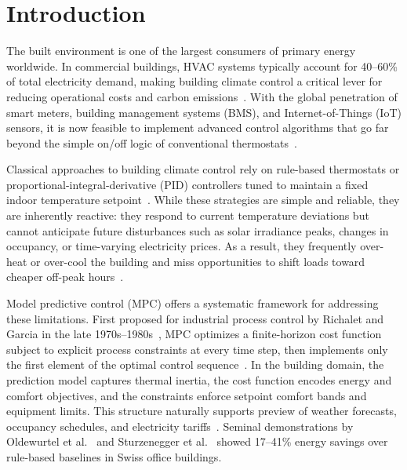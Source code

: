 \documentclass[conference,a4paper]{IEEEtran}[2015/08/26]
\begin{document}
\IEEEpeerreviewmaketitle

\section{Introduction}
\label{sec:introduction}

The built environment is one of the largest consumers of primary energy
worldwide. In commercial buildings, HVAC systems typically account for
40--60\% of total electricity demand, making building climate control a
critical lever for reducing operational costs and carbon
emissions~\cite{ASHRAE2017,Drgona2020}. With the global penetration of
smart meters, building management systems (BMS), and Internet-of-Things
(IoT) sensors, it is now feasible to implement advanced control
algorithms that go far beyond the simple on/off logic of conventional
thermostats~\cite{Sturzenegger2016}.

Classical approaches to building climate control rely on rule-based
thermostats or proportional-integral-derivative (PID) controllers tuned
to maintain a fixed indoor temperature setpoint~\cite{Bengea2014}. While
these strategies are simple and reliable, they are inherently reactive:
they respond to current temperature deviations but cannot anticipate
future disturbances such as solar irradiance peaks, changes in occupancy,
or time-varying electricity prices. As a result, they frequently
over-heat or over-cool the building and miss opportunities to shift loads
toward cheaper off-peak hours~\cite{Halvgaard2012}.

Model predictive control (MPC) offers a systematic framework for
addressing these limitations. First proposed for industrial process
control by Richalet and Garcia in the late
1970s--1980s~\cite{Garcia1989}, MPC optimizes a finite-horizon cost
function subject to explicit process constraints at every time step,
then implements only the first element of the optimal control
sequence~\cite{Rawlings2017,Mayne2000}. In the building domain, the
prediction model captures thermal inertia, the cost function encodes
energy and comfort objectives, and the constraints enforce setpoint
comfort bands and equipment limits. This structure naturally supports
preview of weather forecasts, occupancy schedules, and electricity
tariffs~\cite{Oldewurtel2012}. Seminal demonstrations by Oldewurtel et
al.~\cite{Oldewurtel2012} and Sturzenegger et al.~\cite{Sturzenegger2016}
showed 17--41\% energy savings over rule-based baselines in Swiss office
buildings.
\end{document}
